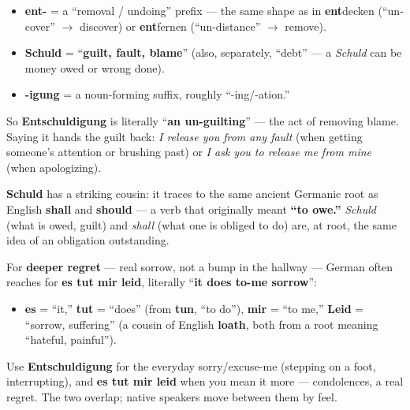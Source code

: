 \begin{cousinweb}
\begin{itemize}
\raggedright
  \item \textbf{ent-} = a \textquotedblleft{}removal / undoing\textquotedblright{} prefix — the same shape as in \textbf{ent}decken (\textquotedblleft{}un-cover\textquotedblright{} $\to$ discover) or \textbf{ent}fernen (\textquotedblleft{}un-distance\textquotedblright{} $\to$ remove).
  \item \textbf{Schuld} = \textquotedblleft{}\textbf{guilt, fault, blame}\textquotedblright{} (also, separately, \textquotedblleft{}debt\textquotedblright{} — a \emph{Schuld} can be money owed or wrong done).
  \item \textbf{-igung} = a noun-forming suffix, roughly \textquotedblleft{}-ing/-ation.\textquotedblright{}
\end{itemize}

So \textbf{Entschuldigung} is literally \textquotedblleft{}\textbf{an un-guilting}\textquotedblright{} — the act of removing blame. Saying it hands the guilt back: \emph{I release you from any fault} (when getting someone's attention or brushing past) or \emph{I ask you to release me from mine} (when apologizing).

\textbf{Schuld} has a striking cousin: it traces to the same ancient Germanic root as English \textbf{shall} and \textbf{should} — a verb that originally meant \textbf{\textquotedblleft{}to owe.\textquotedblright{}} \emph{Schuld} (what is owed, guilt) and \emph{shall} (what one is obliged to do) are, at root, the same idea of an obligation outstanding.
\end{cousinweb}

\begin{culture}
For \textbf{deeper regret} — real sorrow, not a bump in the hallway — German often reaches for \textbf{es tut mir leid}, literally \textquotedblleft{}\textbf{it does to-me sorrow}\textquotedblright{}:

\begin{itemize}
\raggedright
  \item \textbf{es} = \textquotedblleft{}it,\textquotedblright{} \textbf{tut} = \textquotedblleft{}does\textquotedblright{} (from \textbf{tun}, \textquotedblleft{}to do\textquotedblright{}), \textbf{mir} = \textquotedblleft{}to me,\textquotedblright{} \textbf{Leid} = \textquotedblleft{}sorrow, suffering\textquotedblright{} (a cousin of English \textbf{loath}, both from a root meaning \textquotedblleft{}hateful, painful\textquotedblright{}).
\end{itemize}

Use \textbf{Entschuldigung} for the everyday sorry/excuse-me (stepping on a foot, interrupting), and \textbf{es tut mir leid} when you mean it more — condolences, a real regret. The two overlap; native speakers move between them by feel.
\end{culture}

